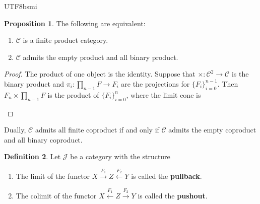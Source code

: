 \documentclass[12pt]{article}
\theoremstyle{definition}
\newtheorem{definition}{Definition}[section]
\newtheorem{property}[definition]{Proposition}
\newcommand\<{\langle}
\renewcommand\>{\rangle}
\begin{document}
\begin{CJK}{UTF8}{bsmi}
\begin{property}
    The following are equivalent:
    \begin{enumerate}
        \item $\mathcal{C}$ is a finite product category.
        \item $\mathcal{C}$ admits the empty product and all binary product.
    \end{enumerate}
\end{property}
\begin{proof}
    The product of one object is the identity. 
    Suppose that $\times:\mathcal{C}^2\to\mathcal{C}$ is the binary product and $\pi_i:\prod_{n-1} F\to F_i$ are the projections for $\{F_i\}_{i=0}^{n-1}$.
    Then $F_n\times\prod_{n-1}F$ is the product of $\{F_i\}_{i=0}^n$, where the limit cone is
    \begin{center}
    \end{center}
\end{proof}

Dually, $\mathcal{C}$ admits all finite coproduct if and only if $\mathcal{C}$ admits the empty coproduct and all binary coproduct.

\begin{definition}
    Let $\mathcal{J}$ be a category with the structure
    \begin{center}
    \end{center}
    \begin{enumerate}
        \item The limit of the functor $X\xrightarrow{F_1}Z\xleftarrow{F_2}Y$ is called the \textbf{pullback}.
        \item The colimit of the functor $X\xleftarrow{F_1}Z\xrightarrow{F_2}Y$ is called the \textbf{pushout}.
    \end{enumerate}
\end{definition}


\end{CJK}
\end{document}
